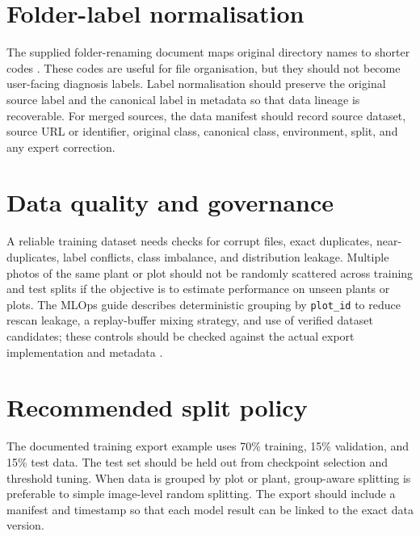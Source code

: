 \documentclass[12pt,a4paper,oneside,openany]{report}
\begin{document}
\section{Folder-label normalisation}
The supplied folder-renaming document maps original directory names to shorter codes \cite{dataset_doc}. These codes are useful for file organisation, but they should not become user-facing diagnosis labels. Label normalisation should preserve the original source label and the canonical label in metadata so that data lineage is recoverable. For merged sources, the data manifest should record source dataset, source URL or identifier, original class, canonical class, environment, split, and any expert correction.

\section{Data quality and governance}
A reliable training dataset needs checks for corrupt files, exact duplicates, near-duplicates, label conflicts, class imbalance, and distribution leakage. Multiple photos of the same plant or plot should not be randomly scattered across training and test splits if the objective is to estimate performance on unseen plants or plots. The MLOps guide describes deterministic grouping by \texttt{plot\_id} to reduce rescan leakage, a replay-buffer mixing strategy, and use of verified dataset candidates; these controls should be checked against the actual export implementation and metadata \cite{mlops_guide}.

\section{Recommended split policy}
The documented training export example uses 70\% training, 15\% validation, and 15\% test data. The test set should be held out from checkpoint selection and threshold tuning. When data is grouped by plot or plant, group-aware splitting is preferable to simple image-level random splitting. The export should include a manifest and timestamp so that each model result can be linked to the exact data version.
\end{document}
